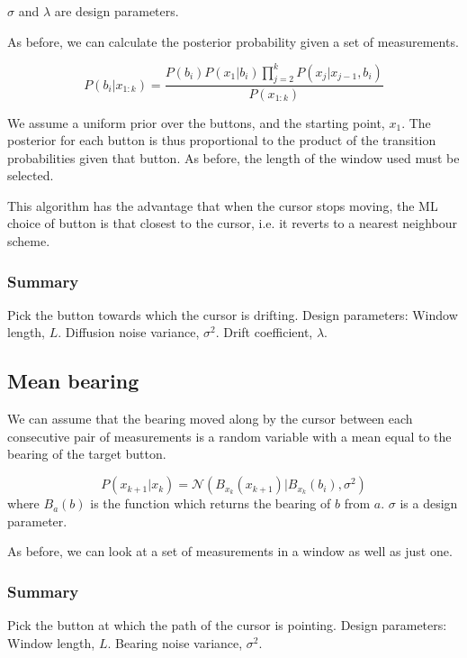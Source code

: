 $\sigma$ and $\lambda$ are design parameters.

As before, we can calculate the posterior probability given a set of measurements.

\begin{equation}
P(b_i|x_{1:k}) = \frac{P(b_i)P(x_1|b_i)\prod_{j=2}^{k}{P(x_j|x_{j-1}, b_i)}}{P(x_{1:k})}
\end{equation}

We assume a uniform prior over the buttons, and the starting point, $x_1$. The posterior for each button is thus proportional to the product of the transition probabilities given that button. As before, the length of the window used must be selected.

This algorithm has the advantage that when the cursor stops moving, the ML choice of button is that closest to the cursor, i.e. it reverts to a nearest neighbour scheme.

\subsubsection*{Summary}
Pick the button towards which the cursor is drifting.
Design parameters: Window length, $L$. Diffusion noise variance, $\sigma^2$. Drift coefficient, $\lambda$.



\subsection{Mean bearing}
We can assume that the bearing moved along by the cursor between each consecutive pair of measurements is a random variable with a mean equal to the bearing of the target button.

\begin{equation}P(x_{k+1}|x_{k}) = \mathcal{N}(B_{x_k}(x_{k+1})|B_{x_k}(b_i), \sigma^2)\end{equation}
where $B_{a}(b)$ is the function which returns the bearing of $b$ from $a$. $\sigma$ is a design parameter.

As before, we can look at a set of measurements in a window as well as just one.

\subsubsection*{Summary}
Pick the button at which the path of the cursor is pointing.
Design parameters: Window length, $L$. Bearing noise variance, $\sigma^2$.




